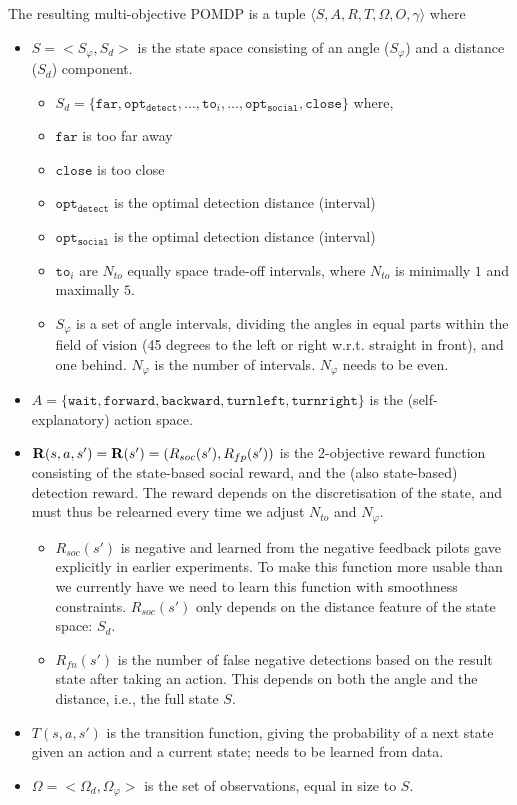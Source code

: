 \documentclass[a4paper,11pt]{report}
\begin{document}
The resulting multi-objective POMDP is  a tuple $\langle S,A,R,T,\Omega,O,\gamma\rangle$ where 
\begin{itemize}
\item $S = < S_{\varphi}, S_{d}>$ is the state space consisting of an angle ($S_{\varphi}$) and a distance  ($S_{d}$) component. 
\begin{itemize}
\item $S_{d} = \{\mathtt{far}, \mathtt{opt_{detect}}, \dots, \mathtt{to}_i, \dots, \mathtt{opt_{social}}, \mathtt{close}\}$ where, 
\item $\mathtt{far}$ is too far away
\item $\mathtt{close}$ is too close
\item $\mathtt{opt_{detect}}$ is the optimal detection distance (interval)
\item $\mathtt{opt_{social}}$ is the optimal detection distance (interval)
\item $\mathtt{to}_i$ are $N_{to}$ equally space trade-off intervals, where $N_{to}$ is minimally $1$ and maximally $5$. 
\item $S_{\varphi}$ is a set of angle intervals, dividing the angles in equal parts within the field of vision (45 degrees to the left or right w.r.t. straight in front), and one behind. $N_{\varphi}$ is the number of intervals. $N_{\varphi}$ needs to be even.
\end{itemize}
\item $A = \{\mathtt{wait}, \mathtt{forward}, \mathtt{backward}, \mathtt{turnleft}, \mathtt{turnright}\}$ is the (self-explanatory) action space.
\item ${\bf R}(s,a,s') = {\bf R}(s')  = ({R}_{soc}(s'), {R}_{fp}(s'))$ is the 2-objective reward function consisting of the state-based social reward, and the (also state-based) detection reward.  The reward depends on the discretisation of the state, and must thus be relearned every time we adjust $N_{to}$ and $N_{\varphi}$.
\begin{itemize}
\item ${R}_{soc}(s')$ is negative and learned from the negative feedback pilots gave explicitly in earlier experiments. To make this function more usable than we currently have we need to learn this function with smoothness constraints. ${R}_{soc}(s')$ only depends on the distance feature of the state space: $S_{d}$. 

\item ${R}_{fn}(s')$ is the number of false negative detections based on the result state after taking an action. This depends on both the angle and the distance, i.e., the full state $S$. 
\end{itemize}
\item $T(s,a,s')$ is the transition function, giving the probability of a next state given an action and a current state; needs to be learned from data. 
\item $\Omega = < \Omega_{d}, \Omega_{\varphi} >$ is the set of observations, equal in size to $S$. 


\end{itemize}
\end{document}
